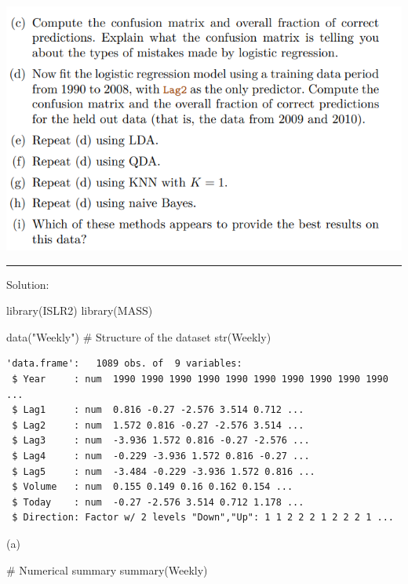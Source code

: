 \documentclass[
]{article}
\newenvironment{Shaded}{\begin{snugshade}}{\end{snugshade}}
\newcommand{\CommentTok}[1]{\textcolor[rgb]{0.37,0.37,0.37}{#1}}
\newcommand{\FunctionTok}[1]{\textcolor[rgb]{0.28,0.35,0.67}{#1}}
\newcommand{\NormalTok}[1]{\textcolor[rgb]{0.00,0.23,0.31}{#1}}
\newcommand{\StringTok}[1]{\textcolor[rgb]{0.13,0.47,0.30}{#1}}
\begin{document}
\includegraphics[width=6.88542in,height=\textheight]{images/clipboard-3390512393.png}

\begin{center}\rule{0.5\linewidth}{0.5pt}\end{center}

Solution:

\begin{Shaded}
\begin{Highlighting}[]
\FunctionTok{library}\NormalTok{(ISLR2)}
\FunctionTok{library}\NormalTok{(MASS)}

\FunctionTok{data}\NormalTok{(}\StringTok{"Weekly"}\NormalTok{)}
\CommentTok{\# Structure of the dataset}
\FunctionTok{str}\NormalTok{(Weekly)}
\end{Highlighting}
\end{Shaded}

\begin{verbatim}
'data.frame':   1089 obs. of  9 variables:
 $ Year     : num  1990 1990 1990 1990 1990 1990 1990 1990 1990 1990 ...
 $ Lag1     : num  0.816 -0.27 -2.576 3.514 0.712 ...
 $ Lag2     : num  1.572 0.816 -0.27 -2.576 3.514 ...
 $ Lag3     : num  -3.936 1.572 0.816 -0.27 -2.576 ...
 $ Lag4     : num  -0.229 -3.936 1.572 0.816 -0.27 ...
 $ Lag5     : num  -3.484 -0.229 -3.936 1.572 0.816 ...
 $ Volume   : num  0.155 0.149 0.16 0.162 0.154 ...
 $ Today    : num  -0.27 -2.576 3.514 0.712 1.178 ...
 $ Direction: Factor w/ 2 levels "Down","Up": 1 1 2 2 2 1 2 2 2 1 ...
\end{verbatim}

(a)

\begin{Shaded}
\begin{Highlighting}[]
\CommentTok{\# Numerical summary}
\FunctionTok{summary}\NormalTok{(Weekly)}
\end{Highlighting}
\end{Shaded}
\end{document}
